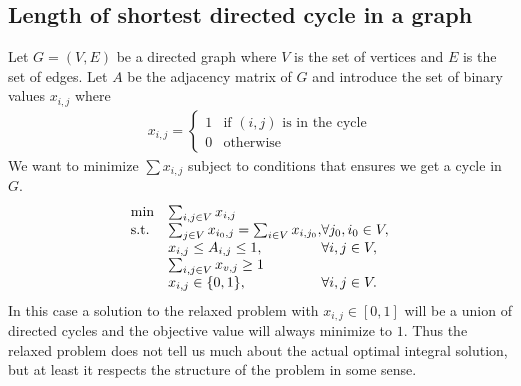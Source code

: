 \begin{example}
\section{Length of shortest directed cycle in a graph}
Let $G=(V,E)$ be a directed graph where $V$ is the set of vertices and $E$ is the set of edges. Let $A$ be the adjacency matrix of $G$ and introduce the set of binary values $x_{i,j}$ where
\begin{align*}
x_{i,j} = \left\{
\begin{array}{ll}
1 & \text{if } (i,j) \text{ is in the cycle} \\ 0 & \text{otherwise}
\end{array}\right.
\end{align*}
We want to minimize $\sum x_{i,j}$ subject to conditions that ensures we get a cycle in $G$.
\begin{align}
\begin{array}{ll@{}ll}
\text{min} & \sum_{i,j \in V}x_{i,j}&\\
\text{s.t.} & \sum_{j\in V}x_{i_0,j} = \sum_{i\in V}x_{i,j_0},& \forall j_0,i_0 \in V,\\
&x_{i,j}\leq A_{i,j} \leq 1,&\forall i,j \in V,\\
&\sum_{i,j\in V}x_{v,j} \geq 1&\\
&x_{i,j} \in \{0,1\},&\forall i,j \in V.\\
\end{array}
\end{align}
In this case a solution to the relaxed problem with $x_{i,j} \in [0,1]$ will be a union of directed cycles and the objective value will always minimize to $1$. Thus the relaxed problem does not tell us much about the actual optimal integral solution, but at least it respects the structure of the problem in some sense.\\

\end{example}
